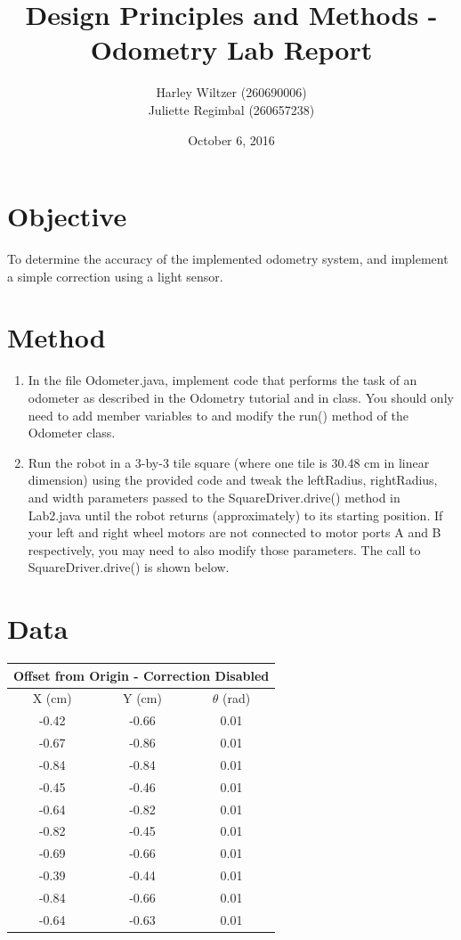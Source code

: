 \documentclass[11pt]{article} %
\title{Design Principles and Methods - Odometry Lab Report}
\author{Harley Wiltzer (260690006)\\Juliette Regimbal (260657238)}
\date{October 6, 2016} %
\begin{document}
\maketitle

\section{Objective}
To determine the accuracy of the implemented odometry system, and implement a simple correction using a light sensor.
\section{Method}
\begin{enumerate}
\item In the file Odometer.java, implement code that performs the task of an odometer as
described in the Odometry tutorial and in class. You should only need to add member variables
to and modify the run() method of the Odometer class.
\item Run the robot in a 3-by-3 tile square (where one tile is 30.48 cm in linear dimension) using the
provided code and tweak the leftRadius, rightRadius, and width parameters passed
to the SquareDriver.drive() method in Lab2.java until the robot returns
(approximately) to its starting position. If your left and right wheel motors are not connected to
motor ports A and B respectively, you may need to also modify those parameters. The call to
SquareDriver.drive() is shown below.
\end{enumerate}
\section{Data}
\begin{center}
\begin{tabular}{ | c | c | c | }
\multicolumn{3}{c}{Offset from Origin - Correction Disabled} \\ \hline
X (cm) & Y (cm) & $\theta$ (rad)\\ \hline
-0.42 & -0.66 & 0.01 \\ \hline
-0.67 & -0.86 & 0.01 \\ \hline
-0.84 & -0.84 & 0.01 \\ \hline
-0.45 & -0.46 & 0.01 \\ \hline
-0.64 & -0.82 & 0.01 \\ \hline
-0.82 & -0.45 & 0.01 \\ \hline
-0.69 & -0.66 & 0.01 \\ \hline
-0.39 & -0.44 & 0.01 \\ \hline
-0.84 & -0.66 & 0.01 \\ \hline
-0.64 & -0.63 & 0.01 \\ \hline
\end{tabular}
\end{center}
\end{document}
